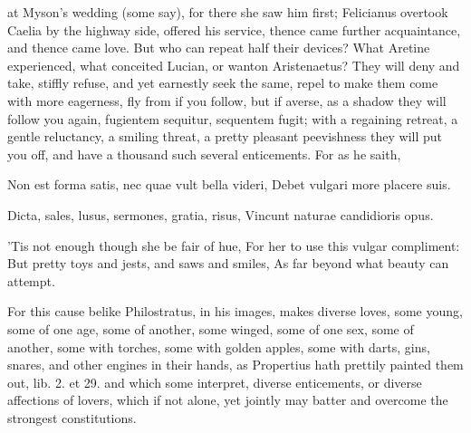 {at Myson's wedding (some say), for there she saw him first; Felicianus
overtook Caelia by the highway side, offered his service, thence came
further acquaintance, and thence came love. But who can repeat half
their devices? What Aretine experienced, what conceited Lucian, or
wanton Aristenaetus? They will deny and take, stiffly refuse, and yet
earnestly seek the same, repel to make them come with more eagerness,
fly from if you follow, but if averse, as a shadow they will follow you
again, fugientem sequitur, sequentem fugit; with a regaining retreat, a
gentle reluctancy, a smiling threat, a pretty pleasant peevishness they
will put you off, and have a thousand such several enticements. For as
he saith,

Non est forma satis, nec quae vult bella videri,
Debet vulgari more placere suis.

Dicta, sales, lusus, sermones, gratia, risus,
Vincunt naturae candidioris opus.


'Tis not enough though she be fair of hue,
For her to use this vulgar compliment:
But pretty toys and jests, and saws and smiles,
As far beyond what beauty can attempt.

For this cause belike Philostratus, in his images, makes diverse
loves, some young, some of one age, some of another, some winged, some
of one sex, some of another, some with torches, some with golden
apples, some with darts, gins, snares, and other engines in their
hands, as Propertius hath prettily painted them out, lib. 2. et 29. and
which some interpret, diverse enticements, or diverse affections of
lovers, which if not alone, yet jointly may batter and overcome the
strongest constitutions.

}
